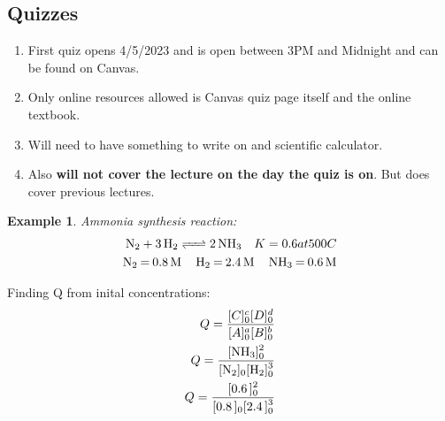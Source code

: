\documentclass{article}  %
\newtheorem{exmp}{Example}
\begin{document}
\subsection*{Quizzes}
\begin{enumerate}
    \item First quiz opens 4/5/2023 and is open between 3PM and Midnight and can be found on Canvas.
    \item Only online resources allowed is Canvas quiz page itself and the online textbook.
    \item Will need to have something to write on and scientific calculator.
    \item Also \textbf{will not cover the lecture on the day the quiz is on}. But does cover previous lectures.
\end{enumerate}

\begin{exmp}
    Ammonia synthesis reaction: \\
    \begin{equation*}
        \begin{aligned}
            \ce{N2 + 3 H2 <=> 2 NH3} \quad K = 0.6 at 500C \\
            \ce{N2 = 0.8M \quad H2 = 2.4M \quad NH3 = 0.6M} \\        
        \end{aligned}
    \end{equation*}
\end{exmp}

Finding Q from inital concentrations:
\begin{equation*}
    \begin{aligned}
        Q = \frac{[C]^c_0[D]^d_0}{[A]^a_0[B]^b_0} \\
        Q = \ce{\frac{[NH3]^2_0}{[N2]_0[H2]^3_0}} \\
        Q = \ce{\frac{[0.6]^2_0}{[0.8]_0[2.4]^3_0}} \\
    \end{aligned}
\end{equation*}
\end{document}
